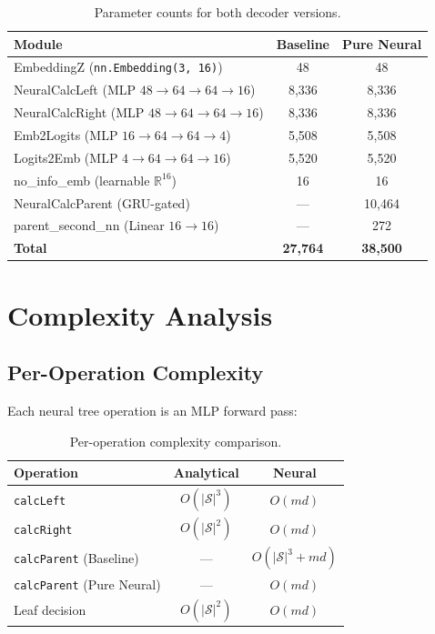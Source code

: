 \documentclass[11pt,a4paper]{article}
\newcommand{\R}{\mathbb{R}}
\begin{document}
\begin{table}[H]
\centering
\caption{Parameter counts for both decoder versions.}
\label{tab:params}
\begin{tabular}{lcc}
\toprule
Module & Baseline & Pure Neural \\
\midrule
EmbeddingZ (\texttt{nn.Embedding(3, 16)}) & 48 & 48 \\
NeuralCalcLeft (MLP $48 \to 64 \to 64 \to 16$) & 8{,}336 & 8{,}336 \\
NeuralCalcRight (MLP $48 \to 64 \to 64 \to 16$) & 8{,}336 & 8{,}336 \\
Emb2Logits (MLP $16 \to 64 \to 64 \to 4$) & 5{,}508 & 5{,}508 \\
Logits2Emb (MLP $4 \to 64 \to 64 \to 16$) & 5{,}520 & 5{,}520 \\
no\_info\_emb (learnable $\R^{16}$) & 16 & 16 \\
NeuralCalcParent (GRU-gated) & --- & 10{,}464 \\
parent\_second\_nn (Linear $16 \to 16$) & --- & 272 \\
\midrule
\textbf{Total} & \textbf{27{,}764} & \textbf{38{,}500} \\
\bottomrule
\end{tabular}
\end{table}

\section{Complexity Analysis}
\label{sec:complexity}

\subsection{Per-Operation Complexity}

Each neural tree operation is an MLP forward pass:

\begin{table}[H]
\centering
\caption{Per-operation complexity comparison.}
\label{tab:op_complexity}
\begin{tabular}{lcc}
\toprule
Operation & Analytical & Neural \\
\midrule
\texttt{calcLeft} & $O(|\mathcal{S}|^3)$ & $O(md)$ \\
\texttt{calcRight} & $O(|\mathcal{S}|^2)$ & $O(md)$ \\
\texttt{calcParent} (Baseline) & --- & $O(|\mathcal{S}|^3 + md)$ \\
\texttt{calcParent} (Pure Neural) & --- & $O(md)$ \\
Leaf decision & $O(|\mathcal{S}|^2)$ & $O(md)$ \\
\bottomrule
\end{tabular}
\end{table}
\end{document}
